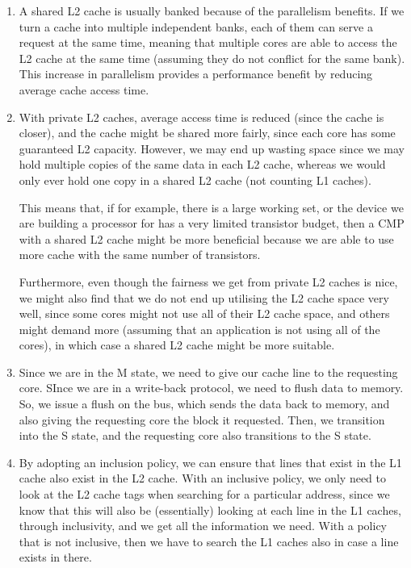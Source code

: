 


\begin{enumerate}[label=(\alph*)]
  \item
    A shared L2 cache is usually banked because of the parallelism benefits. If we turn a cache into multiple independent banks, each of them can serve a request at the same time, meaning that multiple cores are able to access the L2 cache at the same time (assuming they do not conflict for the same bank). This increase in parallelism provides a performance benefit by reducing average cache access time.

  \item
    With private L2 caches, average access time is reduced (since the cache is closer), and the cache might be shared more fairly, since each core has some guaranteed L2 capacity. However, we may end up wasting space since we may hold multiple copies of the same data in each L2 cache, whereas we would only ever hold one copy in a shared L2 cache (not counting L1 caches).

    This means that, if for example, there is a large working set, or the device we are building a processor for has a very limited transistor budget, then a CMP with a shared L2 cache might be more beneficial because we are able to use more cache with the same number of transistors.

    Furthermore, even though the fairness we get from private L2 caches is nice, we might also find that we do not end up utilising the L2 cache space very well, since some cores might not use all of their L2 cache space, and others might demand more (assuming that an application is not using all of the cores), in which case a shared L2 cache might be more suitable.

  \item
    Since we are in the M state, we need to give our cache line to the requesting core. SInce we are in a write-back protocol, we need to flush data to memory. So, we issue a flush on the bus, which sends the data back to memory, and also giving the requesting core the block it requested. Then, we transition into the S state, and the requesting core also transitions to the S state.

  \item
    By adopting an inclusion policy, we can ensure that lines that exist in the L1 cache also exist in the L2 cache. With an inclusive policy, we only need to look at the L2 cache tags when searching for a particular address, since we know that this will also be (essentially) looking at each line in the L1 caches, through inclusivity, and we get all the information we need. With a policy that is not inclusive, then we have to search the L1 caches also in case a line exists in there.


\end{enumerate}

